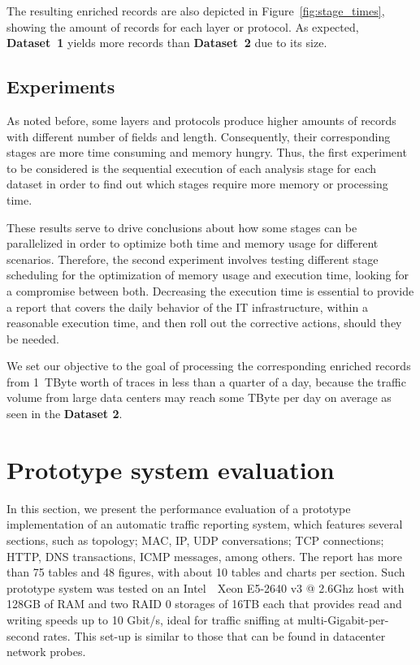 \documentclass[AMA,STIX1COL]{WileyNJD-v2}
\begin{document}
The resulting enriched records are also depicted in Figure~\ref{fig:stage_times}, showing the amount of records for each layer or protocol. As expected, \textbf{Dataset~1} yields more records than \textbf{Dataset~2} due to its size. 


\subsection{Experiments}
As noted before, some layers and protocols produce higher amounts of records with different number of fields and length. Consequently, their corresponding stages are more time consuming and memory hungry. Thus, the first experiment to be considered is the sequential execution of each analysis stage for each dataset in order to find out which stages require more  memory or processing time. 

These results serve to drive conclusions about how some stages can be parallelized in order to optimize both time and memory usage for different scenarios. Therefore, the second experiment involves testing different stage scheduling for the optimization of memory usage and execution time, looking for a compromise between both.
Decreasing the execution time is essential to provide a report that covers the daily behavior of the IT infrastructure, within a reasonable execution time, and then roll out the corrective actions, should they be needed.

We set our objective to the goal of processing the corresponding enriched records from 1~TByte worth of traces in less than a quarter of a day, because the traffic volume from large data centers may reach some TByte per day on average as seen in the \textbf{Dataset 2}.

\section{Prototype system evaluation}
\label{sec:eval}
 In this section, we present the performance evaluation of a prototype implementation of an automatic traffic reporting system, which features several sections, such as topology; MAC, IP, UDP conversations; TCP connections; HTTP, DNS transactions, ICMP messages, among others. The report has  more than 75 tables and 48 figures, with about 10 tables and charts per section. Such prototype system was tested on an Intel~\textregistered~Xeon E5-2640 v3 @ 2.6Ghz host with 128GB of RAM and two RAID 0 storages of 16TB each that provides read and writing speeds up to 10 Gbit/s, ideal for traffic sniffing at multi-Gigabit-per-second rates. This set-up is similar to those that can be found in datacenter network probes.
\end{document}

